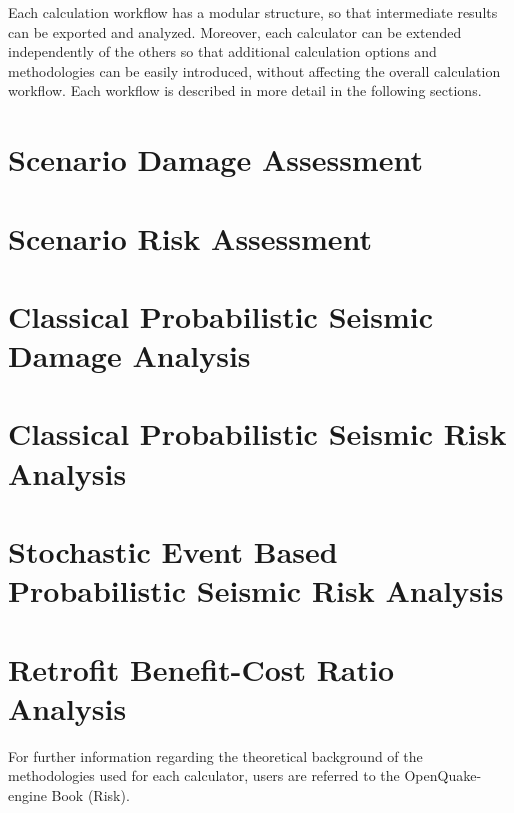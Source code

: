 Each calculation workflow has a modular structure, so that intermediate
results can be exported and analyzed. Moreover, each calculator can be
extended independently of the others so that additional calculation options
and methodologies can be easily introduced, without affecting the overall
calculation workflow. Each workflow is described in more detail in the
following sections.

\section{Scenario Damage Assessment}
\label{sec:workflow_scenario_damage}


\section{Scenario Risk Assessment}
\label{sec:workflow_scenario_risk}


\section{Classical Probabilistic Seismic Damage Analysis}
\label{sec:workflow_classical_damage}


\section{Classical Probabilistic Seismic Risk Analysis}
\label{sec:workflow_classical_risk}


\section{Stochastic Event Based Probabilistic Seismic Risk Analysis}
\label{sec:workflow_event_based_risk}


\section{Retrofit Benefit-Cost Ratio Analysis}
\label{sec:workflow_benefit_cost}


For further information regarding the theoretical background of the
methodologies used for each calculator, users are referred to the OpenQuake-
engine Book (Risk).

\cleardoublepage